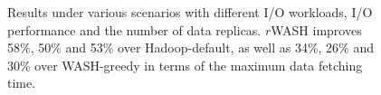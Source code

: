 \documentclass[conference]{IEEEtran}
\begin{document}
\begin{figure}[!t]
	\centering
	\quad\quad %
	\quad\quad
	\vspace{-1ex}
	\caption{Results under various scenarios with different I/O workloads, I/O performance and the number of data replicas. $r$WASH improves 58\%, 50\% and 53\% over Hadoop-default, as well as 34\%, 26\% and 30\% over WASH-greedy in terms of the maximum data fetching time.}
	\label{Fig:complete}
	\vspace{-1ex}
\end{figure}

\end{document}
